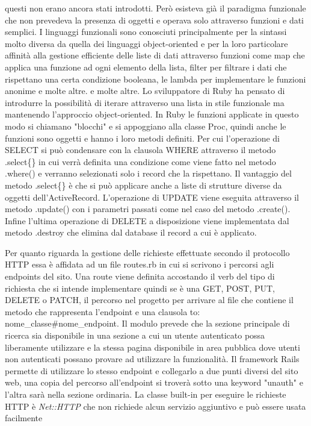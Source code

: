 \documentclass[target=bach,aauheader=,style=]{thud}
\begin{document}
questi non erano ancora stati introdotti. Però esisteva già il paradigma funzionale che non prevedeva la presenza di oggetti e operava solo attraverso funzioni e dati semplici.
I linguaggi funzionali sono conosciuti principalmente per la sintassi molto diversa da quella dei linguaggi object-oriented e per la loro particolare affinità alla gestione
efficiente delle liste di dati attraverso funzioni come map che applica una funzione ad ogni elemento della lista, filter per filtrare i dati che rispettano una certa condizione booleana,
le lambda per implementare le funzioni anonime e molte altre.
e molte altre. Lo sviluppatore di Ruby ha pensato di introdurre la possibilità di iterare attraverso una lista in stile funzionale ma mantenendo l'approccio object-oriented.
In Ruby le funzioni applicate in questo modo si chiamano "blocchi" e si appoggiano alla classe Proc, quindi anche le funzioni sono oggetti e hanno i loro metodi definiti.
Per cui l'operazione di SELECT si può condensare con la clausola WHERE attraverso il metodo .select\{\} in cui verrà definita una condizione come viene fatto nel metodo .where() e verranno
selezionati solo i record che la rispettano. Il vantaggio del metodo .select\{\} è che si può applicare anche a liste di strutture diverse da oggetti dell'ActiveRecord.
L'operazione di UPDATE viene eseguita attraverso il metodo .update() con i parametri passati come nel caso del metodo .create().
Infine l'ultima operazione di DELETE a disposizione viene implementata dal metodo .destroy che elimina dal database il record a cui è applicato.
\par Per quanto riguarda la gestione delle richieste effettuate secondo il protocollo HTTP essa è affidata ad un file routes.rb in cui si scrivono i percorsi agli endpoints del sito.
Una route viene definita accostando il verb del tipo di richiesta che si intende implementare quindi se è una GET, POST, PUT, DELETE o PATCH, il percorso nel progetto per arrivare al
file che contiene il metodo che rappresenta l'endpoint e una clausola to: nome\_classe\#nome\_endpoint. Il modulo prevede che la sezione principale di ricerca sia disponibile in una sezione a
cui un utente autenticato possa liberamente utilizzare e la stessa pagina disponibile in area pubblica dove utenti non autenticati possano provare ad utilizzare la funzionalità.
Il framework Rails permette di utilizzare lo stesso endpoint e collegarlo a due punti diversi del sito web, una copia del percorso all'endpoint si troverà sotto una keyword "unauth"
e l'altra sarà nella sezione ordinaria. La classe built-in per eseguire le richieste HTTP è \textit{Net::HTTP} che non richiede alcun servizio aggiuntivo e può essere usata facilmente
\end{document}
